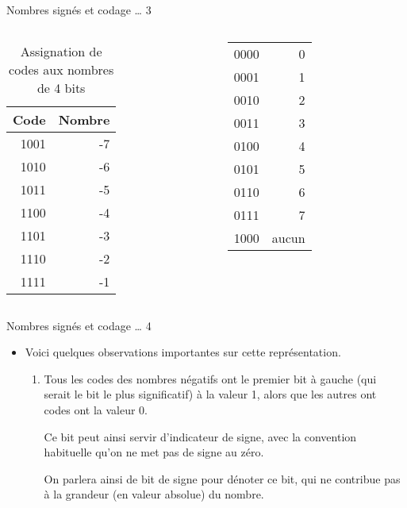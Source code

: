 \documentclass[presentation]{beamer}
\begin{document}
\begin{frame}[label={sec:org7fedabe}]{Nombres signés et codage \ldots{} 3}
\begin{columns}
\begin{column}{0.48\columnwidth}
\begin{block}{}
\begin{table}[htbp]
\caption{\label{tab:org936f239}Assignation de codes aux nombres de 4 bits}
\centering
\begin{tabular}{rr}
Code & Nombre\\
\hline
1001 & -7\\
1010 & -6\\
1011 & -5\\
1100 & -4\\
1101 & -3\\
1110 & -2\\
1111 & -1\\
\end{tabular}
\end{table}
\end{block}
\end{column}

\begin{column}{0.48\columnwidth}
\begin{block}{}
\begin{center}
\begin{tabular}{rr}
0000 & 0\\
0001 & 1\\
0010 & 2\\
0011 & 3\\
0100 & 4\\
0101 & 5\\
0110 & 6\\
0111 & 7\\
1000 & aucun\\
\end{tabular}
\end{center}
\end{block}
\end{column}
\end{columns}
\end{frame}

\begin{frame}[label={sec:org9d807c8}]{Nombres signés et codage \ldots{} 4}
\begin{itemize}
\item Voici quelques observations importantes sur cette représentation.

\begin{enumerate}
\item Tous les codes des nombres négatifs ont le premier bit à gauche (qui serait le bit le plus significatif) à la valeur 1, alors que les autres ont codes ont la valeur 0.

Ce bit peut ainsi servir d'indicateur de signe, avec la convention habituelle qu'on ne met pas de signe au zéro.

On parlera ainsi de \alert{bit de signe} pour dénoter ce bit, qui ne contribue pas à la grandeur (en valeur absolue) du nombre.
\end{enumerate}
\end{itemize}
\end{frame}
\end{document}
